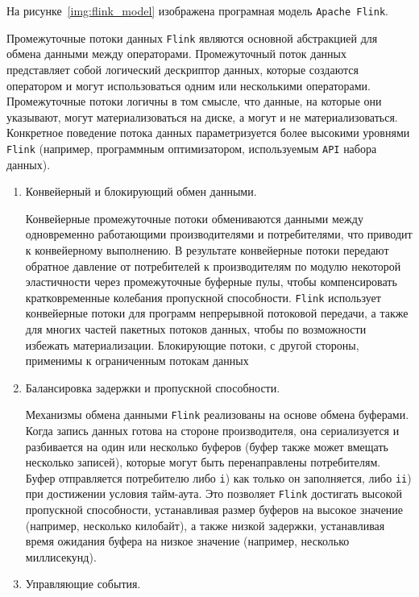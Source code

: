 На рисунке~\ref{img:flink_model} изображена програмная модель \texttt{Apache Flink}.


Промежуточные потоки данных \texttt{Flink} являются основной абстракцией для обмена данными между операторами. 
Промежуточный поток данных представляет собой логический дескриптор данных, которые создаются оператором и могут использоваться одним или несколькими операторами.
Промежуточные потоки логичны в том смысле, что данные, на которые они указывают, могут материализоваться на диске, а могут и не материализоваться. 
Конкретное поведение потока данных параметризуется более высокими уровнями \texttt{Flink} (например, программным оптимизатором, используемым \texttt{API} набора данных).

\begin{enumerate}
  \item Конвейерный и блокирующий обмен данными.

    Конвейерные промежуточные потоки обмениваются данными между одновременно работающими производителями и потребителями, что приводит к конвейерному выполнению. 
    В результате конвейерные потоки передают обратное давление от потребителей к производителям по модулю некоторой эластичности через промежуточные буферные пулы, чтобы компенсировать кратковременные колебания пропускной способности. 
    \texttt{Flink} использует конвейерные потоки для программ непрерывной потоковой передачи, а также для многих частей пакетных потоков данных, чтобы по возможности избежать материализации. 
    Блокирующие потоки, с другой стороны, применимы к ограниченным потокам данных
  \item Балансировка задержки и пропускной способности.

    Механизмы обмена данными \texttt{Flink} реализованы на основе обмена буферами. 
    Когда запись данных готова на стороне производителя, она сериализуется и разбивается на один или несколько буферов (буфер также может вмещать несколько записей), которые могут быть перенаправлены потребителям. 
    Буфер отправляется потребителю либо \texttt{i}) как только он заполняется, либо \texttt{ii}) при достижении условия тайм-аута. 
    Это позволяет \texttt{Flink} достигать высокой пропускной способности, устанавливая размер буферов на высокое значение (например, несколько килобайт), а также низкой задержки, устанавливая время ожидания буфера на низкое значение (например, несколько миллисекунд).
  \item Управляющие события.


\end{enumerate}
